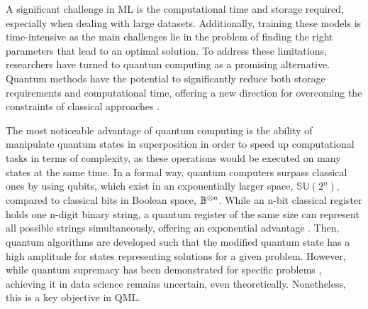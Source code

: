 \documentclass{article}
\begin{document}
A significant challenge in ML is the computational time and storage required, especially when dealing with large datasets. Additionally, training these models is time-intensive as the main challenges lie in the problem of finding the right parameters that lead to an optimal solution. To address these limitations, researchers have turned to quantum computing as a promising alternative. Quantum methods have the potential to significantly reduce both storage requirements and computational time, offering a new direction for overcoming the constraints of classical approaches \cite{degruyterIntroductionQuantum}.

The most noticeable advantage of quantum computing is the ability of manipulate quantum states in superposition in order to speed up computational tasks in terms of complexity, as these operations would be executed on many states at the same time. In a formal way, quantum computers surpass classical ones by using qubits, which exist in an exponentially larger space, $\mathbb{SU}(2^n)$, compared to classical bits in Boolean space, $\mathbb{B}^{\tens{} n} $. While an n-bit classical register holds one n-digit binary string, a quantum register of the same size can represent all possible strings simultaneously, offering an exponential advantage \cite{Nielsen_Chuang_2010}. Then, quantum algorithms are developed such that the modified quantum state has a high amplitude for states representing solutions for a given problem. 
However, while quantum supremacy has been demonstrated for specific problems \cite{Arute2019}, achieving it in data science remains uncertain, even theoretically. Nonetheless, this is a key objective in QML.
\end{document}
